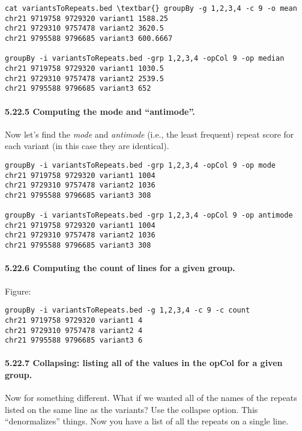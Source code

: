 \documentclass[letterpaper,10pt,english]{sphinxmanual}
\begin{document}
\begin{Verbatim}[commandchars=\\\{\}]
cat variantsToRepeats.bed \textbar{} groupBy -g 1,2,3,4 -c 9 -o mean
chr21 9719758 9729320 variant1 1588.25
chr21 9729310 9757478 variant2 3620.5
chr21 9795588 9796685 variant3 600.6667

groupBy -i variantsToRepeats.bed -grp 1,2,3,4 -opCol 9 -op median
chr21 9719758 9729320 variant1 1030.5
chr21 9729310 9757478 variant2 2539.5
chr21 9795588 9796685 variant3 652
\end{Verbatim}


\paragraph{5.22.5 Computing the mode and ``antimode''.}
\label{content/groupBy:computing-the-mode-and-antimode}
Now let's find the \emph{mode} and \emph{antimode} (i.e., the least frequent) repeat score for each variant (in this case
they are identical).

\begin{Verbatim}[commandchars=\\\{\}]
groupBy -i variantsToRepeats.bed -grp 1,2,3,4 -opCol 9 -op mode
chr21 9719758 9729320 variant1 1004
chr21 9729310 9757478 variant2 1036
chr21 9795588 9796685 variant3 308

groupBy -i variantsToRepeats.bed -grp 1,2,3,4 -opCol 9 -op antimode
chr21 9719758 9729320 variant1 1004
chr21 9729310 9757478 variant2 1036
chr21 9795588 9796685 variant3 308
\end{Verbatim}


\paragraph{5.22.6 Computing the count of lines for a given group.}
\label{content/groupBy:computing-the-count-of-lines-for-a-given-group}
Figure:

\begin{Verbatim}[commandchars=\\\{\}]
groupBy -i variantsToRepeats.bed -g 1,2,3,4 -c 9 -c count
chr21 9719758 9729320 variant1 4
chr21 9729310 9757478 variant2 4
chr21 9795588 9796685 variant3 6
\end{Verbatim}


\paragraph{5.22.7 Collapsing: listing all of the values in the opCol for a given group.}
\label{content/groupBy:collapsing-listing-all-of-the-values-in-the-opcol-for-a-given-group}
Now for something different. What if we wanted all of the names of the repeats listed on the same line
as the variants? Use the collapse option. This ``denormalizes'' things. Now you have a list of all the
repeats on a single line.
\end{document}
